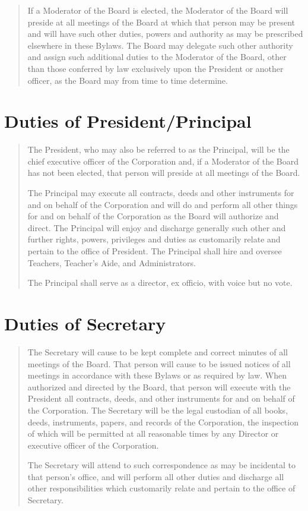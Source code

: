 \documentclass[
]{book}
\begin{document}
\begin{quote}
If a Moderator of the Board is elected, the Moderator of the Board
will preside at all meetings of the Board at which that person may be
present and will have such other duties, powers and authority as may
be prescribed elsewhere in these Bylaws. The Board may delegate such
other authority and assign such additional duties to the Moderator of
the Board, other than those conferred by law exclusively upon the
President or another officer, as the Board may from time to time
determine.
\end{quote}

\section{Duties of President/Principal}\label{duties-of-presidentprincipal}

\begin{quote}
The President, who may also be referred to as the Principal, will be
the chief executive officer of the Corporation and, if a Moderator of
the Board has not been elected, that person will preside at all
meetings of the Board.

The Principal may execute all contracts, deeds and other instruments
for and on behalf of the Corporation and will do and perform all other
things for and on behalf of the Corporation as the Board will
authorize and direct. The Principal will enjoy and discharge generally
such other and further rights, powers, privileges and duties as
customarily relate and pertain to the office of President. The
Principal shall hire and oversee Teachers, Teacher's Aide, and
Administrators.

The Principal shall serve as a director, ex officio, with voice but no
vote.
\end{quote}

\section{Duties of Secretary}\label{duties-of-secretary}

\begin{quote}
The Secretary will cause to be kept complete and correct minutes of
all meetings of the Board. That person will cause to be issued notices
of all meetings in accordance with these Bylaws or as required by law.
When authorized and directed by the Board, that person will execute
with the President all contracts, deeds, and other instruments for and
on behalf of the Corporation. The Secretary will be the legal
custodian of all books, deeds, instruments, papers, and records of the
Corporation, the inspection of which will be permitted at all
reasonable times by any Director or executive officer of the
Corporation.

The Secretary will attend to such correspondence as may be incidental
to that person's office, and will perform all other duties and
discharge all other responsibilities which customarily relate and
pertain to the office of Secretary.
\end{quote}
\end{document}
